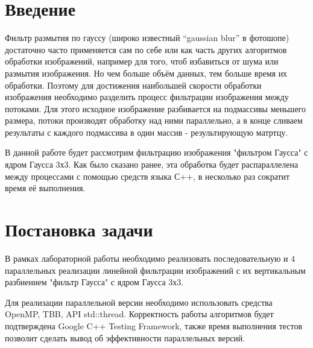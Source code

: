 \documentclass{report}
\begin{document}
\setcounter{page}{2}

\tableofcontents
\newpage

\section*{Введение}
Фильтр размытия по гауссу (широко известный “gaussian blur” в фотошопе) достаточно часто применяется сам по себе или как часть других алгоритмов обработки изображений, например для того, чтоб избавиться от шума или размытия изображения.
Но чем больше объём данных, тем больше время их обработки. Поэтому для достижения наибольшей скорости обработки изображения необходимо разделить процесс фильтрации изображения между потоками. Для этого исходное изображение разбивается на подмассивы меньшего размера, потоки производят обработку над ними параллельно, а в конце сливаем результаты с каждого подмассива в один массив - результирующую матртцу.
\par В данной  работе будет рассмотрим фильтрацию изображения "фильтром Гаусса" с ядром Гаусса 3х3. Как было сказано ранее, эта обработка будет распараллелена между процессами с помощью средств языка С++, в несколько раз сократит время её выполнения.
\newpage

\section*{Постановка задачи}
В рамках лабораторной работы необходимо реализовать последовательную и 4 параллельных реализации линейной фильтрации изображений с их вертикальным разбиением "фильтр Гаусса" с ядром Гаусса 3х3. 
\par Для реализации параллельной версии необходимо использовать средства OpenMP, TBB, API std::thread. Корректность работы алгоритмов будет подтверждена Google C++ Testing Framework, также время выполнения тестов позволит сделать вывод об эффективности параллельных версий.
\newpage

\end{document}
